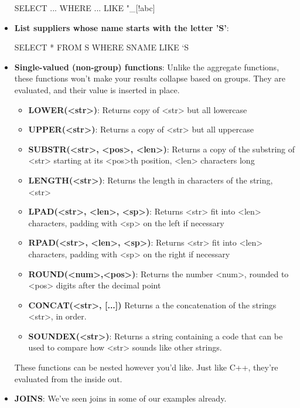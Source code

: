 \documentclass{report}
\begin{document}
\begin{itemize}
\begin{sqlcode}
            SELECT ...
                WHERE ... LIKE "_[!abc]%
            \end{sqlcode}
        \item \textbf{List suppliers whose name starts with the letter 'S'}:
            \bigbreak \noindent 
            \begin{sqlcode}
                SELECT * FROM S
                    WHERE SNAME LIKE `S%
            \end{sqlcode}
        \item \textbf{Single-valued (non-group) functions}: Unlike the aggregate functions, these functions won’t make your results collapse based on groups. They are evaluated, and their value is inserted in place.
            \begin{itemize}
                \item \textbf{LOWER(<str>)}: Returns copy of <str> but all lowercase
                \item \textbf{UPPER(<str>)}: Returns a copy of <str> but all uppercase
                \item \textbf{SUBSTR(<str>, <pos>, <len>)}: Returns a copy of the substring of <str> starting at its <pos>th position, <len> characters long
                \item \textbf{LENGTH(<str>)}: Returns the length in characters of the string, <str>
                \item \textbf{LPAD(<str>, <len>, <sp>)}: Returns <str> fit into <len> characters, padding with <sp> on the left if necessary
                \item \textbf{RPAD(<str>, <len>, <sp>)}: Returns <str> fit into <len> characters, padding with <sp> on the right if necessary
                \item \textbf{ROUND(<num>,<pos>)}: Returns the number <num>, rounded to <pos> digits after the decimal point
                \item \textbf{CONCAT(<str>, [...])} Returns a the concatenation of the strings <str>, in order.
                \item \textbf{SOUNDEX(<str>)}: Returns a string containing a code that can be used to compare how <str> sounds like other strings.
            \end{itemize}
            \bigbreak \noindent 
            These functions can be nested however you’d like. Just like C++, they’re evaluated from the inside out.
        \item \textbf{JOINS}: We’ve seen joins in some of our examples already.

\end{itemize}
\end{document}
